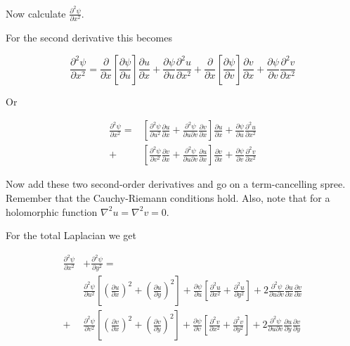 \begin{cue}
Now calculate $\frac{\partial^2 \psi}{\partial x^2}$.
\end{cue}

For the second derivative this becomes

\begin{equation}
\frac{\partial^2 \psi}{\partial x^2} = \frac{\partial}{\partial x} \left[
\frac{\partial \psi}{\partial u}\right]  \frac{\partial u}{\partial x} +
\frac{\partial \psi}{\partial u}\frac{\partial^2 u}{\partial x^2} +  
\frac{\partial}{\partial x} \left[ \frac{\partial \psi}{\partial v}\right] 
\frac{\partial v}{\partial x}  + \frac{\partial \psi}{\partial
v}\frac{\partial^2 v}{\partial x^2}
\end{equation} 

Or

\begin{align}
\frac{\partial^2 \psi}{\partial x^2} = &\left[ \frac{\partial^2 \psi}{\partial u^2 } \frac{\partial u}{\partial x} +  \frac{\partial^2 \psi}{\partial u \partial v} \frac{\partial v}{\partial x} \right] \frac{\partial u}{\partial x}  + \frac{\partial \psi}{\partial u}\frac{\partial^2 u}{\partial x^2} \nonumber \\ 
+ &\left[ \frac{\partial^2 \psi}{\partial v^2 } \frac{\partial v}{\partial x} + 
\frac{\partial^2 \psi}{\partial u \partial v} \frac{\partial u}{\partial x}
\right] \frac{\partial v}{\partial x} + \frac{\partial \psi}{\partial v}\frac{\partial^2 v}{\partial x^2}
\end{align} 

\begin{cue}
Now add these two second-order derivatives and go on a term-cancelling spree. Remember that the Cauchy-Riemann conditions hold. Also, note that for a holomorphic function $\nabla^2 u = \nabla^2 v=0$.
\end{cue}

For the total Laplacian we get

\begin{align}
\frac{\partial^2 \psi}{\partial x^2} &+ \frac{\partial^2 \psi}{\partial y^2}= \nonumber \\
  &\frac{\partial^2 \psi}{\partial u^2 }  \left [ \left(\frac{\partial u}{\partial x}\right)^2 + \left(\frac{\partial u}{\partial y}\right)^2\right]+ \frac{\partial \psi}{\partial u} \left[ \frac{\partial^2 u}{\partial x^2}  + \frac{\partial^2 u}{\partial y^2} \right] + 2\frac{\partial^2 \psi}{\partial u \partial v} \frac{\partial u}{\partial x} \frac{\partial v}{\partial x}    \nonumber \\  
+ &\frac{\partial^2 \psi}{\partial v^2}  \left[ \left(\frac{\partial v}{\partial
x}\right)^2 + \left(\frac{\partial v}{\partial y}\right)^2\right] + \frac{\partial
\psi}{\partial v} \left[ \frac{\partial^2 v}{\partial x^2} + \frac{\partial^2 v}{\partial y^2} \right] + 2\frac{\partial^2 \psi}{\partial u \partial v} \frac{\partial u}{\partial y} \frac{\partial v}{\partial y}
\label{eq-conf-trans-1}
\end{align} 

